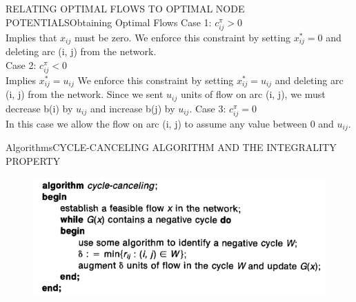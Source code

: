 \documentclass{beamer}
\begin{document}
\begin{frame}{RELATING OPTIMAL FLOWS TO OPTIMAL NODE
  POTENTIALS}{Obtaining Optimal Flows} 
  Case 1: $c_{ij}^{\pi} > 0 $\\ 
  Implies that $x_{ij} $ must be zero. We enforce this constraint by setting $x_{ij}^*  = 0$ and deleting arc (i, j) from the network. \\ 
  Case 2: $c_{ij}^{\pi} < 0 $\\
  Implies $x_{ij}^* = u_{ij}$ We enforce this constraint by setting $x_{ij}^* = u_{ij}$ and deleting arc (i, j) from the network. Since we sent $u_{ij}$ units of flow on
  arc (i, j), we must decrease b(i) by $u_{ij}$ and increase b(j) by $u_{ij}$.
  Case 3: $c_{ij}^{\pi} = 0 $\\
  In this case we allow the flow on arc (i, j) to assume any value between 0 and $u_{ij}$.
\end{frame}

\begin{frame}{Algorithms}{CYCLE-CANCELING ALGORITHM AND THE
  INTEGRALITY PROPERTY}
\begin{figure}[h!t]
\centering
\includegraphics[scale = 0.6]{pseudocodigocyclecanceling.png}  
\end{figure}
\end{frame}
\end{document}
